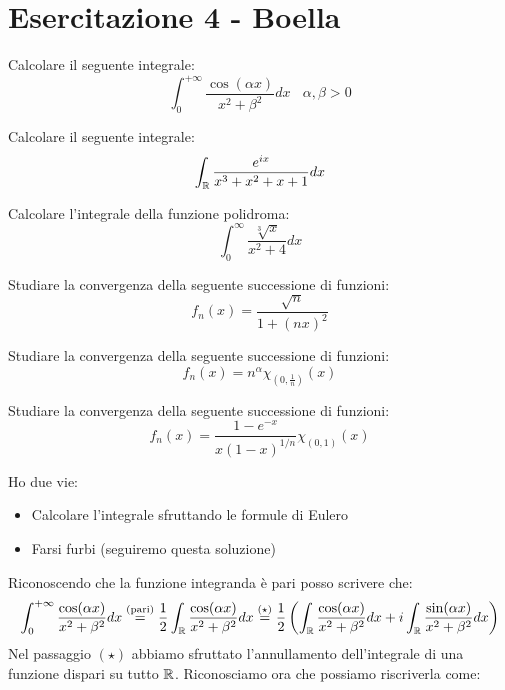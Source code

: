 \chapter{Esercitazione 4 - Boella}
\ParteEsercizi
\Esercizio{}

Calcolare il seguente integrale:
\begin{equation*}
\int^{+ \infty}_{0}\frac{\cos (\alpha x)}{x^{2} + \beta^{2}} dx\ \ \ \ \alpha, \beta > 0
\end{equation*}
\Esercizio{}

Calcolare il seguente integrale:
\begin{equation*}
\int_{\mathbb{R}}\frac{e^{ix}}{x^{3} + x^{2} + x + 1} dx
\end{equation*}
\Esercizio{}

Calcolare l'integrale della funzione polidroma:
\begin{equation*}
\int^{\infty}_{0}\frac{\sqrt[3]{x}}{x^{2} + 4} dx
\end{equation*}
\Esercizio{}

Studiare la convergenza della seguente successione di funzioni:
\begin{equation*}
f_{n} (x) = \frac{\sqrt{n}}{1 + (nx)^{2}}
\end{equation*}
\Esercizio{}

Studiare la convergenza della seguente successione di funzioni:
\begin{equation*}
f_{n} (x) = n^{\alpha} \chi_{\left(0, \frac{1}{n}\right)} (x)
\end{equation*}
\Esercizio{}

Studiare la convergenza della seguente successione di funzioni:
\begin{equation*}
f_{n} (x) = \frac{1 - e^{- x}}{x(1 - x)^{1/n}} \chi_{(0, 1)} (x)
\end{equation*}
\ParteSoluzioni
\Soluzione

Ho due vie:
\begin{itemize}
\item Calcolare l'integrale sfruttando le formule di Eulero
\item Farsi furbi (seguiremo questa soluzione)
\end{itemize}

Riconoscendo che la funzione integranda è pari posso scrivere che:
\begin{equation*}
\int^{+ \infty}_{0}\frac{\cos (\alpha x)}{x^{2} + \beta^{2}} dx\overset{\text{(pari)}}{=}\frac{1}{2}\int_{\mathbb{R}}\frac{\cos (\alpha x)}{x^{2} + \beta^{2}} dx\overset{(\star)}{=}\frac{1}{2}\left(\int_{\mathbb{R}}\frac{\cos (\alpha x)}{x^{2} + \beta^{2}} dx + i\int_{\mathbb{R}}\frac{\sin (\alpha x)}{x^{2} + \beta^{2}} dx\right)
\end{equation*}
Nel passaggio $(\star)$ abbiamo sfruttato l'annullamento dell'integrale di una funzione dispari su tutto $\mathbb{R} $. Riconosciamo ora che possiamo riscriverla come:

